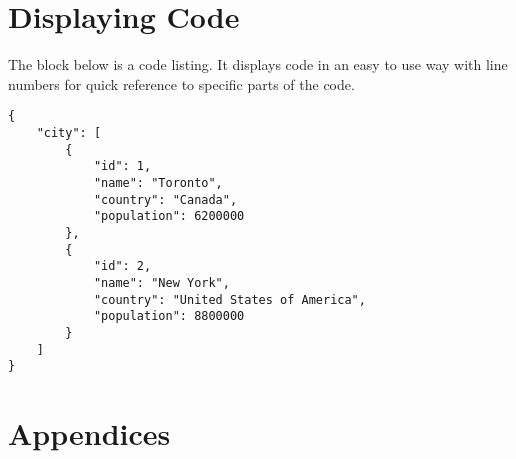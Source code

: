 \documentclass[
	a4paper, %
	12pt, %
]{CSSullivanBusinessReport}
\begin{document}
\section{Displaying Code}

The block below is a code listing. It displays code in an easy to use way with line numbers for quick reference to specific parts of the code.

\begin{lstlisting}
{
	"city": [
		{
			"id": 1,
			"name": "Toronto",
			"country": "Canada",
			"population": 6200000
		},
		{
			"id": 2,
			"name": "New York",
			"country": "United States of America",
			"population": 8800000
		}
	]
}
\end{lstlisting}


\newpage


\begin{twothirdswidth} %
	\printbibliography[title=Reference List] %
\end{twothirdswidth}


\newpage

\section*{Appendices}
\end{document}
